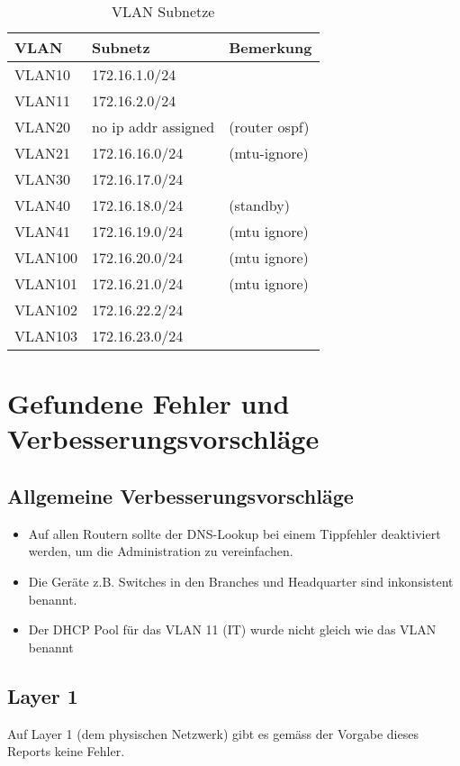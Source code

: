 \begin{table}[h]
	\centering
	\begin{tabu} to \linewidth {l l l}
		\toprule 
		VLAN & Subnetz & Bemerkung \\
		\midrule
		VLAN10 & 172.16.1.0/24 & \\
		VLAN11 & 172.16.2.0/24 & \\
		VLAN20 & no ip addr assigned & (router ospf) \\
		VLAN21 & 172.16.16.0/24 & (mtu-ignore) \\
		VLAN30 & 172.16.17.0/24 & \\
		VLAN40 & 172.16.18.0/24 & (standby) \\
		VLAN41 & 172.16.19.0/24 & (mtu ignore) \\
		VLAN100 & 172.16.20.0/24 & (mtu ignore) \\
		VLAN101 & 172.16.21.0/24 & (mtu ignore) \\
		VLAN102 & 172.16.22.2/24 & \\
		VLAN103 & 172.16.23.0/24 & \\
		\bottomrule 
	\end{tabu} 
	\caption{VLAN Subnetze}
\end{table}





\section{Gefundene Fehler und Verbesserungsvorschläge}


\subsection{Allgemeine Verbesserungsvorschläge}

\begin{itemize}
	\item Auf allen Routern sollte der DNS-Lookup bei einem Tippfehler deaktiviert werden, um die Administration zu vereinfachen.
	\item Die Geräte z.B. Switches in den Branches und Headquarter sind inkonsistent benannt.
	\item Der DHCP Pool für das VLAN 11 (IT) wurde nicht gleich wie das VLAN benannt
\end{itemize}

\subsection{Layer 1}
Auf Layer 1 (dem physischen Netzwerk) gibt es gemäss der Vorgabe dieses Reports keine Fehler.

